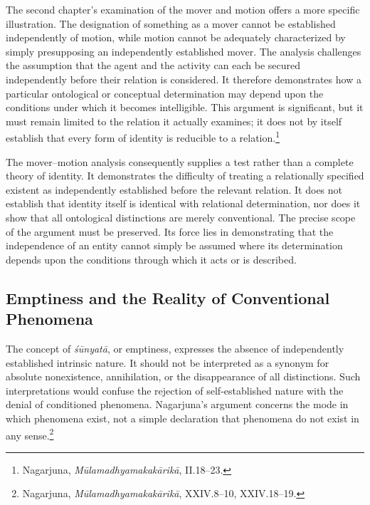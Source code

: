 
\label{para:VS.B01.P01.C08.S18.SS06.P002}
The second chapter's examination of the mover and motion offers a more specific illustration. The designation of something as a mover cannot be established independently of motion, while motion cannot be adequately characterized by simply presupposing an independently established mover. The analysis challenges the assumption that the agent and the activity can each be secured independently before their relation is considered. It therefore demonstrates how a particular ontological or conceptual determination may depend upon the conditions under which it becomes intelligible. This argument is significant, but it must remain limited to the relation it actually examines; it does not by itself establish that every form of identity is reducible to a relation.\footnote{Nagarjuna, \emph{M\={u}lamadhyamakak\={a}rik\={a}}, II.18--23.}

\label{para:VS.B01.P01.C08.S18.SS06.P003}
The mover--motion analysis consequently supplies a test rather than a complete theory of identity. It demonstrates the difficulty of treating a relationally specified existent as independently established before the relevant relation. It does not establish that identity itself is identical with relational determination, nor does it show that all ontological distinctions are merely conventional. The precise scope of the argument must be preserved. Its force lies in demonstrating that the independence of an entity cannot simply be assumed where its determination depends upon the conditions through which it acts or is described.

\subsection{Emptiness and the Reality of Conventional Phenomena}
\label{subsec:ch08_s18_ss07}

\label{para:VS.B01.P01.C08.S18.SS07.P001}
The concept of \emph{\'{s}\={u}nyat\={a}}, or emptiness, expresses the absence of independently established intrinsic nature. It should not be interpreted as a synonym for absolute nonexistence, annihilation, or the disappearance of all distinctions. Such interpretations would confuse the rejection of self-established nature with the denial of conditioned phenomena. Nagarjuna's argument concerns the mode in which phenomena exist, not a simple declaration that phenomena do not exist in any sense.\footnote{Nagarjuna, \emph{M\={u}lamadhyamakak\={a}rik\={a}}, XXIV.8--10, XXIV.18--19.}


